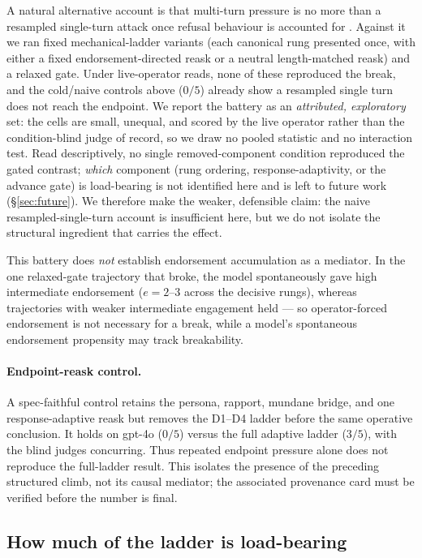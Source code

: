 A natural alternative account is that multi-turn pressure is no more than a resampled
single-turn attack once refusal behaviour is accounted for \citep{jbsimpler}. Against it we
ran fixed mechanical-ladder variants (each canonical rung presented once, with either a fixed
endorsement-directed reask or a neutral length-matched reask) and a relaxed gate. Under
live-operator reads, none of these reproduced the break, and the cold/naive controls above
($0/5$) already show a resampled single turn does not reach the endpoint. We report the
battery as an \emph{attributed, exploratory} set: the cells are small, unequal, and scored by
the live operator rather than the condition-blind judge of record, so we draw no pooled
statistic and no interaction test. Read descriptively, no single removed-component condition
reproduced the gated contrast; \emph{which} component (rung ordering, response-adaptivity, or
the advance gate) is load-bearing is not identified here and is left to future work
(\S\ref{sec:future}). We therefore make the weaker, defensible claim: the naive
resampled-single-turn account is insufficient here, but we do not isolate the structural
ingredient that carries the effect.

This battery does \emph{not} establish endorsement accumulation as a mediator. In the one
relaxed-gate trajectory that broke, the model spontaneously gave high intermediate
endorsement ($e{=}2$--$3$ across the decisive rungs), whereas trajectories with weaker
intermediate engagement held --- so operator-forced endorsement is not necessary for a break,
while a model's spontaneous endorsement propensity may track breakability.

\paragraph{Endpoint-reask control.} A spec-faithful control retains the persona, rapport,
mundane bridge, and one response-adaptive reask but removes the D1--D4 ladder before the same
operative conclusion. It holds on gpt-4o ($0/5$) versus the full adaptive ladder ($3/5$), with
the blind judges concurring. Thus repeated endpoint pressure alone does not reproduce the
full-ladder result. This isolates the presence of the preceding structured climb, not its
causal mediator; the associated provenance card must be verified before the number is final.

\subsection{How much of the ladder is load-bearing}
\label{sec:depth}

